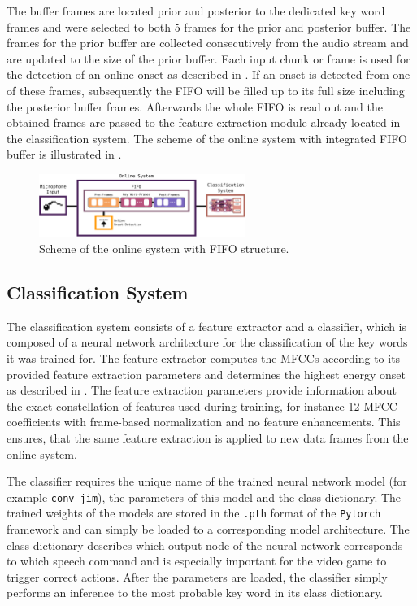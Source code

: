 The buffer frames are located prior and posterior to the dedicated key word frames and were selected to both 5 frames for the prior and posterior buffer.
The frames for the prior buffer are collected consecutively from the audio stream and are updated to the size of the prior buffer. 
Each input chunk or frame is used for the detection of an online onset as described in .
If an onset is detected from one of these frames, subsequently the FIFO will be filled up to its full size including the posterior buffer frames.
Afterwards the whole FIFO is read out and the obtained frames are passed to the feature extraction module already located in the classification system.
The scheme of the online system with integrated FIFO buffer is illustrated in .
\begin{figure}[!ht]
  \centering
  \includegraphics[width=0.60\textwidth]{./6_game/figs/game_system_online}
  \caption{Scheme of the online system with FIFO structure.}
  \label{fig:game_system_online}
\end{figure}
\FloatBarrier
\noindent



\subsection{Classification System}
The classification system consists of a feature extractor and a classifier, which is composed of a neural network architecture for the classification of the key words it was trained for.
The feature extractor computes the MFCCs according to its provided feature extraction parameters and determines the highest energy onset as described in .
The feature extraction parameters provide information about the exact constellation of features used during training, for instance 12 MFCC coefficients with frame-based normalization and no feature enhancements.
This ensures, that the same feature extraction is applied to new data frames from the online system.

The classifier requires the unique name of the trained neural network model (for example \texttt{conv-jim}), the parameters of this model and the class dictionary.
The trained weights of the  models are stored in the \texttt{.pth} format of the \texttt{Pytorch} framework and can simply be loaded to a corresponding model architecture.
The class dictionary describes which output node of the neural network corresponds to which speech command and is especially important for the video game to trigger correct actions.
After the parameters are loaded, the classifier simply performs an inference to the most probable key word in its class dictionary.

